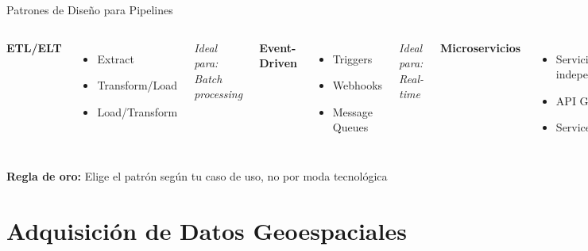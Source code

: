 \documentclass[10pt,aspectratio=169]{beamer}
\begin{document}
\begin{frame}{Patrones de Diseño para Pipelines}
    \begin{columns}[T]
        \textbf{\faStream\space ETL/ELT}
        \begin{itemize}
            \item Extract
            \item Transform/Load
            \item Load/Transform
        \end{itemize}
        \textit{Ideal para: Batch processing}
        
        \textbf{\faBolt\space Event-Driven}
        \begin{itemize}
            \item Triggers
            \item Webhooks
            \item Message Queues
        \end{itemize}
        \textit{Ideal para: Real-time}
        
        \textbf{\faCodeBranch\space Microservicios}
        \begin{itemize}
            \item Servicios independientes
            \item API Gateway
            \item Service Mesh
        \end{itemize}
        \textit{Ideal para: Escalabilidad}
    \end{columns}
    
    \vspace{0.5cm}
    \begin{tcolorbox}[colframe=gray,colback=gray!10]
        \centering
        \textbf{Regla de oro:} Elige el patrón según tu caso de uso, no por moda tecnológica
    \end{tcolorbox}
\end{frame}

\section{Adquisición de Datos Geoespaciales}
\end{document}
